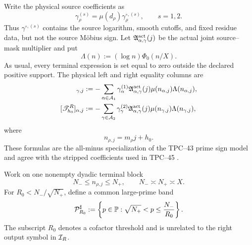 Write the physical source coefficients as
\begin{equation}
 \gamma_\rho^{(s)}=\mu(d_\rho)\gamma_\rho^{\circ,(s)},
 \qquad s=1,2.
 \label{eq:tpc46-source-strip}
\end{equation}
Thus \(\gamma^{\circ,(s)}\) contains the source logarithm, smooth
cutoffs, and fixed residue data, but not the source M\"obius sign.  Let
\(\mathfrak A_{\alpha,\gamma}^{\rm act}(j)\) be the actual joint
source--mask multiplier and put
\begin{equation}
 \Lambda(n):=(\log n)\Phi_0(n/X).
 \label{eq:tpc46-Lambda}
\end{equation}
As usual, every terminal expression is set equal to zero outside the
declared positive support.  The physical left and right equality
columns are
\begin{align}
 [\mathscr T_{h_0}^{L}]_{\gamma,j}
 &:=-\sum_{\alpha\in\cA_1}
 \gamma_\alpha^{(1)}
 \mathfrak A_{\alpha,\gamma}^{\rm act}(j)
 \mu(n_{\alpha,j})\Lambda(n_{\alpha,j}),
 \label{eq:tpc46-physical-left}\\
 [\mathscr T_{h_0}^{R}]_{\alpha,j}
 &:=-\sum_{\gamma\in\cA_2}
 \gamma_\gamma^{(2)}
 \mathfrak A_{\alpha,\gamma}^{\rm act}(j)
 \mu(n_{\gamma,j})\Lambda(n_{\gamma,j}),
 \label{eq:tpc46-physical-right}
\end{align}
where
\begin{equation}
 n_{\rho,j}=m_\rho j+h_0.
 \label{eq:tpc46-physical-target}
\end{equation}
These formulas are the all-minus specialization of the TPC--43 prime
sign model and agree with the stripped coefficients used in TPC--45
\citep{WangTPC43,WangTPC45}.

Work on one nonempty dyadic terminal block
\begin{equation}
 N_-\le n_{\rho,j}\le N_+,
 \qquad N_-\asymp N_+\asymp X.
 \label{eq:tpc46-terminal-block}
\end{equation}
For \(R_0<N_-/\sqrt{N_+}\), define a common large-prime band
\begin{equation}
 \mathcal P_{R_0}^{\sharp}
 :=\left\{p\in\mathbb P:\sqrt{N_+}<p\le \frac{N_-}{R_0}\right\}.
 \label{eq:tpc46-large-prime-band}
\end{equation}
The subscript \(R_0\) denotes a cofactor threshold and is unrelated to
the right output symbol in \(\mathcal I_R\).

